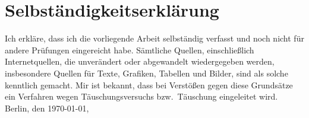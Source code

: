 \documentclass[draft=false,twoside,11pt]{scrreprt}
\begin{document}

\printbibliography
{}

\chapter*{Selbständigkeitserklärung}

Ich erkläre, dass ich die vorliegende Arbeit selbständig verfasst und noch nicht 
für andere Prüfungen eingereicht habe. Sämtliche Quellen, einschließlich
Internetquellen, die unverändert oder abgewandelt wiedergegeben werden,
insbesondere Quellen für Texte, Grafiken, Tabellen und Bilder, sind als solche
kenntlich gemacht. Mir ist bekannt, dass bei Verstößen gegen diese Grundsätze ein
Verfahren wegen Täuschungsversuchs bzw.\ Täuschung eingeleitet wird. 
\bigbreak
\noindent Berlin, den \today, 
\end{document}
